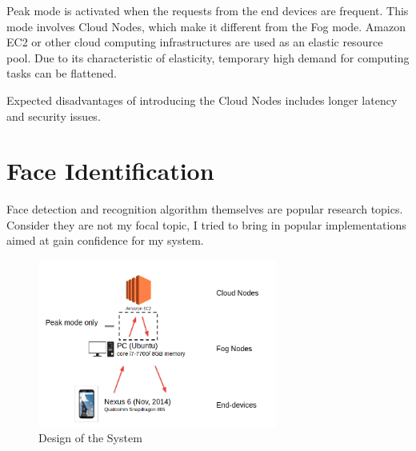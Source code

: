 Peak mode is activated when the requests from the end devices are frequent. This mode involves Cloud Nodes, which make it different from the Fog mode. Amazon EC2 or other cloud computing infrastructures are used as an elastic resource pool. Due to its characteristic of elasticity, temporary high demand for computing tasks can be flattened.

Expected disadvantages of introducing the Cloud Nodes includes longer latency and security issues.

\section{Face Identification}
Face detection and recognition algorithm themselves are popular research topics. Consider they are not my focal topic, I tried to bring in popular implementations aimed at gain confidence for my system.

\begin{figure}
    \centering
    \includegraphics[width=0.7\textwidth]{images/design-of-the-system.png}
    \caption{Design of the System}
    \label{fig:design_of_the_system}
\end{figure}

